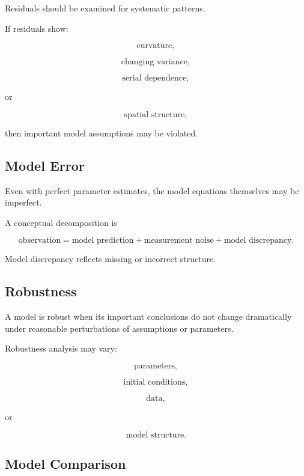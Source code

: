 Residuals should be examined for systematic patterns.

If residuals show:

\[
\boxed{
\text{curvature},
}
\]

\[
\boxed{
\text{changing variance},
}
\]

\[
\boxed{
\text{serial dependence},
}
\]

or

\[
\boxed{
\text{spatial structure},
}
\]

then important model assumptions may be violated.

\subsection{Model Error}
\label{subsec:model-error}

Even with perfect parameter estimates, the model equations themselves may
be imperfect.

A conceptual decomposition is

\[
\boxed{
\text{observation}
=
\text{model prediction}
+
\text{measurement noise}
+
\text{model discrepancy}.
}
\]

Model discrepancy reflects missing or incorrect structure.

\subsection{Robustness}
\label{subsec:model-robustness}

A model is robust when its important conclusions do not change dramatically
under reasonable perturbations of assumptions or parameters.

Robustness analysis may vary:

\[
\boxed{
\text{parameters},
}
\]

\[
\boxed{
\text{initial conditions},
}
\]

\[
\boxed{
\text{data},
}
\]

or

\[
\boxed{
\text{model structure}.
}
\]

\subsection{Model Comparison}
\label{subsec:model-comparison}

